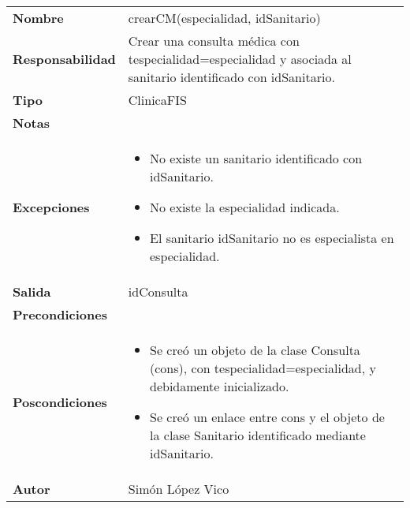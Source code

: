 \documentclass[11pt,a4paper]{article}
\begin{document}
\begin{table}[H]
	\centering
	\label{my-label}
	\begin{tabularx}{\textwidth}{l|X}
		\textbf{Nombre}          & crearCM(especialidad, idSanitario) \\
		\textbf{Responsabilidad} & Crear una consulta médica con tespecialidad=especialidad y asociada al sanitario identificado con idSanitario. \\
		\textbf{Tipo}            & ClinicaFIS \\
		\textbf{Notas}           & \\
		\textbf{Excepciones}     &
		\begin{itemize}
			\item No existe un sanitario identificado con idSanitario.
			\item No existe la especialidad indicada.
			\item El sanitario idSanitario no es especialista en especialidad.
		\end{itemize} \\
		\textbf{Salida}          & idConsulta \\
		\textbf{Precondiciones}  & \\
		\textbf{Poscondiciones}  & 
		\begin{itemize}
			\item Se creó un objeto de la clase Consulta (cons), con tespecialidad=especialidad, y debidamente inicializado.
			\item Se creó un enlace entre cons y el objeto de la clase Sanitario identificado mediante idSanitario.
		\end{itemize} \\
		\textbf{Autor}			 & Simón López Vico
	\end{tabularx}
\end{table}
\end{document}
